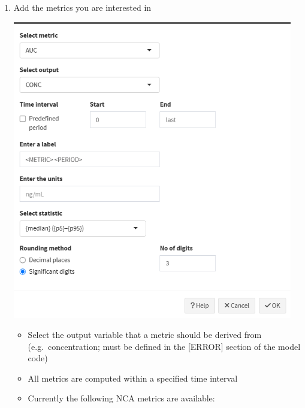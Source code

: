 \documentclass[
]{book}
\providecommand{\tightlist}{%
  \setlength{\itemsep}{0pt}\setlength{\parskip}{0pt}}
\begin{document}
\begin{enumerate}
\def\labelenumi{\arabic{enumi}.}
\item
  Add the metrics you are interested in

  \includegraphics[width=4.8125in,height=\textheight]{pictures/post_processing_new1.png}

  \begin{itemize}
  \tightlist
  \item
    Select the output variable that a metric should be derived from (e.g.~concentration; must be defined in the {[}ERROR{]} section of the model code)
  \item
    All metrics are computed within a specified time interval
  \item
    Currently the following NCA metrics are available:


\end{itemize}
\end{enumerate}
\end{document}
